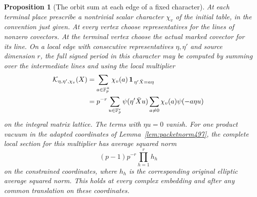 \documentclass[a4paper,11pt]{article}
\newtheorem{proposition}{Proposition}[section]
\theoremstyle{definition}
\theoremstyle{remark}
\numberwithin{equation}{section}
\begin{document}
\begin{proposition}[The orbit sum at each edge of a fixed character]\leavevmode
\label{prop:orbitsum501}
At each terminal place prescribe a nontrivial scalar character
\(\chi_v\) of the initial table, in the convention just given.
At every vertex choose representatives for the lines of nonzero
covectors. At the terminal vertex choose the actual marked
covector for its line. On a local edge with consecutive
representatives \(\eta,\eta'\) and source dimension \(r\), the
full signed period in this character may be computed by summing
over the intermediate lines and using the local multiplier
\[
 \begin{aligned}
 {\cal K}_{\eta,\eta',\chi_v}(X)
  &=\sum_{a\in\mathbb F_p^\times}\chi_v(a)\,
                        {\bf1}_{\,\eta'\bar X=a\eta}\\
  &=p^{-r}\sum_{u\in\mathbb F_p^r}
      \psi(\eta'\bar X u)\sum_{a\ne0}\chi_v(a)\psi(-a\eta u)
 \end{aligned}
\]
on the integral matrix lattice. The terms with \(\eta u=0\)
vanish. For one product vacuum in the adapted coordinates of
Lemma~\ref{lem:packetnorm497}, the complete local section for
this multiplier has average squared norm
\[
           (p-1)p^{-r}\prod_{h=1}^r h_h
\]
on the constrained coordinates, where \(h_h\) is the
corresponding original elliptic average squared norm.
This holds at every complex embedding and after any common
translation on these coordinates.
\end{proposition}
\end{document}
